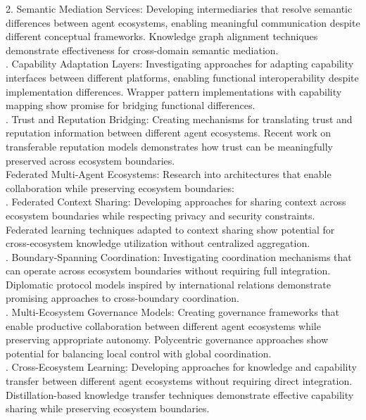 2. Semantic Mediation Services: Developing intermediaries that resolve semantic differences between agent ecosystems, enabling meaningful communication despite different conceptual frameworks. Knowledge graph alignment techniques demonstrate effectiveness for cross-domain semantic mediation.\\ . Capability Adaptation Layers: Investigating approaches for adapting capability interfaces between different platforms, enabling functional interoperability despite implementation differences. Wrapper pattern implementations with capability mapping show promise for bridging functional differences.\\ . Trust and Reputation Bridging: Creating mechanisms for translating trust and reputation information between different agent ecosystems. Recent work on transferable reputation models demonstrates how trust can be meaningfully preserved across ecosystem boundaries.\\ \newline
Federated Multi-Agent Ecosystems: Research into architectures that enable collaboration while preserving ecosystem boundaries:\\ . Federated Context Sharing: Developing approaches for sharing context across ecosystem boundaries while respecting privacy and security constraints. Federated learning techniques adapted to context sharing show potential for cross-ecosystem knowledge utilization without centralized aggregation.\\ . Boundary-Spanning Coordination: Investigating coordination mechanisms that can operate across ecosystem boundaries without requiring full integration. Diplomatic protocol models inspired by international relations demonstrate promising approaches to cross-boundary coordination.\\ . Multi-Ecosystem Governance Models: Creating governance frameworks that enable productive collaboration between different agent ecosystems while preserving appropriate autonomy. Polycentric governance approaches show potential for balancing local control with global coordination.\\ . Cross-Ecosystem Learning: Developing approaches for knowledge and capability transfer between different agent ecosystems without requiring direct integration. Distillation-based knowledge transfer techniques demonstrate effective capability sharing while preserving ecosystem boundaries.\\ \newline
